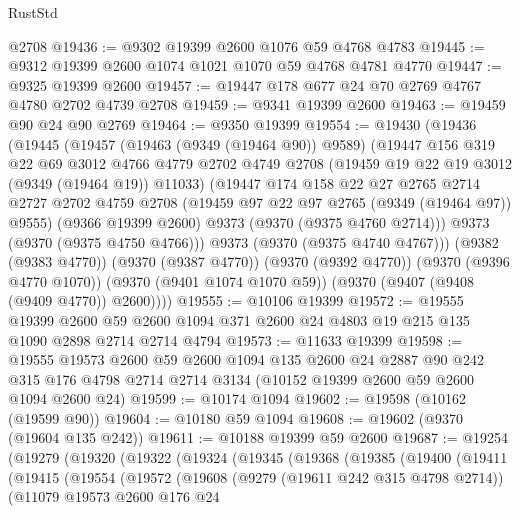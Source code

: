 \begin{lexlean}{RustStd}
\begin{coremodule}
    @2708
@19436 := @9302 @19399 @2600 @1076 @59 @4768 @4783
@19445 := @9312 @19399 @2600 @1074 @1021 @1070 @59 @4768 @4781 @4770
@19447 := @9325 @19399 @2600
@19457 := @19447 @178 @677 @24 @70 @2769 @4767 @4780 @2702 @4739 @2708
@19459 := @9341 @19399 @2600
@19463 := @19459 @90 @24 @90 @2769
@19464 := @9350 @19399
@19554 := @19430
    (@19436
      (@19445
        (@19457
          (@19463 (@9349 (@19464 @90)) @9589)
          (@19447
            @156
            @319
            @22
            @69
            @3012
            @4766
            @4779
            @2702
            @4749
            @2708
            (@19459 @19 @22 @19 @3012 (@9349 (@19464 @19)) @11033)
            (@19447
              @174
              @158
              @22
              @27
              @2765
              @2714
              @2727
              @2702
              @4759
              @2708
              (@19459 @97 @22 @97 @2765 (@9349 (@19464 @97)) @9555)
              (@9366 @19399 @2600)
              @9373
              (@9370 (@9375 @4760 @2714)))
            @9373
            (@9370 (@9375 @4750 @4766)))
          @9373
          (@9370 (@9375 @4740 @4767)))
        (@9382 (@9383 @4770))
        (@9370 (@9387 @4770))
        (@9370 (@9392 @4770))
        (@9370 (@9396 @4770 @1070))
        (@9370 (@9401 @1074 @1070 @59))
        (@9370 (@9407 (@9408 (@9409 @4770)) @2600))))
@19555 := @10106 @19399
@19572 := @19555
    @19399
    @2600
    @59
    @2600
    @1094
    @371
    @2600
    @24
    @4803
    @19
    @215
    @135
    @1090
    @2898
    @2714
    @2714
    @4794
@19573 := @11633 @19399
@19598 := @19555
    @19573
    @2600
    @59
    @2600
    @1094
    @135
    @2600
    @24
    @2887
    @90
    @242
    @315
    @176
    @4798
    @2714
    @2714
    @3134
    (@10152 @19399 @2600 @59 @2600 @1094 @2600 @24)
@19599 := @10174 @1094
@19602 := @19598 (@10162 (@19599 @90))
@19604 := @10180 @59 @1094
@19608 := @19602 (@9370 (@19604 @135 @242))
@19611 := @10188 @19399 @59 @2600
@19687 := @19254
    (@19279
      (@19320
        (@19322
          (@19324
            (@19345
              (@19368
                (@19385
                  (@19400
                    (@19411
                      (@19415
                        (@19554
                          (@19572
                            (@19608
                              (@9279 (@19611 @242 @315 @4798 @2714))
                              (@11079
                                @19573
                                @2600
                                @176
                                @24

\end{coremodule}
\end{lexlean}
